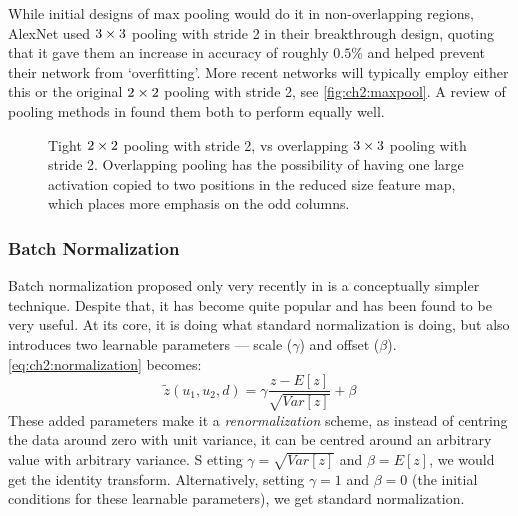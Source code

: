   While initial designs of max pooling would do it in non-overlapping regions, 
  AlexNet used $3\times 3$ pooling with stride 2 in their breakthrough design,
  quoting that it gave them an increase in accuracy of roughly $0.5\%$ and
  helped prevent their network from `overfitting'. More recent networks will
  typically employ either this or the original $2\times 2$ pooling with stride 2,
  see \autoref{fig:ch2:maxpool}. A review of pooling methods in
  \citep{mishkin_systematic_2016} found them both to perform equally well.
  
  \begin{figure}
    \centering
    \centering
    \caption[Tight vs.\ overlapping pooling]
            { Tight $2\times 2$ pooling with stride 2, vs
             overlapping $3\times 3$ pooling with
            stride 2. Overlapping pooling has the possibility of having one
            large activation copied to two positions in the reduced size
            feature map, which places more emphasis on the odd columns.}
    \label{fig:ch2:maxpool}
  \end{figure}

\subsubsection{Batch Normalization}
      Batch normalization proposed only very recently in
      \citep{ioffe_batch_2015} is a conceptually simpler technique. Despite
      that, it has become quite popular and has been found to be very useful.
      At its core, it is doing what standard normalization is doing, but also
      introduces two learnable parameters --- scale ($\gamma$) and offset
      ($\beta$). \eqref{eq:ch2:normalization} becomes:
      \begin{equation}
        \tilde{z}(u_1,u_2,d) = \gamma\frac{z-E[z]}{\sqrt{Var[z]}} + \beta 
				\label{eq:ch2:batch_normalization}
      \end{equation}
      These added parameters make it a \emph{renormalization} scheme, as instead of
      centring the data around zero with unit variance, it can be centred
      around an arbitrary value with arbitrary variance. S etting
      $\gamma = \sqrt{Var[z]}$ and $\beta = E[z]$, we would get the identity
      transform. Alternatively, setting $\gamma = 1$ and $\beta = 0$ (the
      initial conditions for these learnable parameters), we get standard
      normalization.
      
